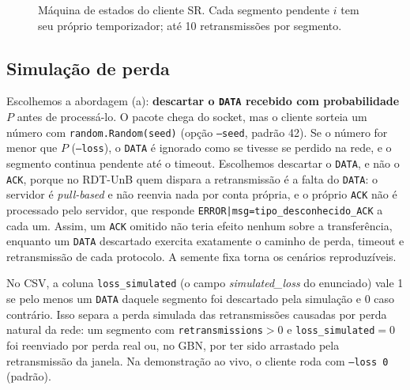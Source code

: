 \documentclass[11pt,a4paper]{article}
\begin{document}
\begin{figure}[H]
\centering
{}
\caption{Máquina de estados do cliente SR. Cada segmento pendente $i$ tem seu
próprio temporizador; até 10 retransmissões por segmento.}
\label{fig:fsm-sr}
\end{figure}

\subsection{Simulação de perda}

Escolhemos a abordagem (a): \textbf{descartar o \texttt{DATA} recebido com
probabilidade $P$} antes de processá-lo. O pacote chega do socket, mas o
cliente sorteia um número com \texttt{random.Random(seed)} (opção
\texttt{--seed}, padrão 42). Se o número for menor que $P$ (\texttt{--loss}), o
\texttt{DATA} é ignorado como se tivesse se perdido na rede, e o segmento
continua pendente até o timeout. Escolhemos descartar o \texttt{DATA}, e não o
\texttt{ACK}, porque no RDT-UnB quem dispara a retransmissão é a falta do
\texttt{DATA}: o servidor é \emph{pull-based} e não reenvia nada por conta
própria, e o próprio \texttt{ACK} não é processado pelo servidor, que
responde \texttt{ERROR|msg=tipo\_desconhecido\_ACK} a cada um. Assim, um
\texttt{ACK} omitido não teria efeito nenhum sobre a transferência,
enquanto um \texttt{DATA} descartado exercita exatamente o caminho de perda,
timeout e retransmissão de cada protocolo. A semente fixa torna os cenários
reproduzíveis.

No CSV, a coluna \texttt{loss\_simulated} (o campo \emph{simulated\_loss} do
enunciado) vale 1 se pelo menos um \texttt{DATA} daquele segmento foi descartado
pela simulação e 0 caso contrário. Isso separa a perda simulada das
retransmissões causadas por perda natural da rede: um segmento com
\texttt{retransmissions}$>0$ e \texttt{loss\_simulated}$=0$ foi reenviado por
perda real ou, no GBN, por ter sido arrastado pela retransmissão da janela. Na
demonstração ao vivo, o cliente roda com \texttt{--loss 0} (padrão).
\end{document}
